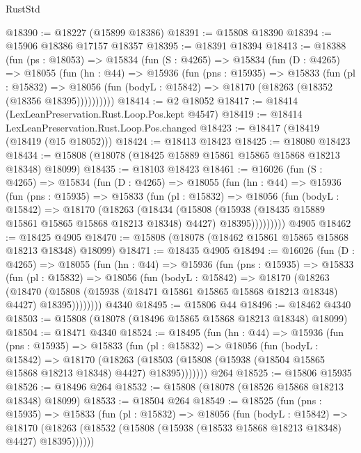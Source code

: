 \begin{lexlean}{RustStd}
\begin{coremodule}
@18390 := @18227 (@15899 @18386)
@18391 := @15808 @18390
@18394 := @15906 @18386 @17157 @18357
@18395 := @18391 @18394
@18413 := @18388
    (fun (ps : @18053) =>
    @15834
      (fun (S : @4265) =>
      @15834
        (fun (D : @4265) =>
        @18055
          (fun (hn : @44) =>
          @15936
            (fun (pns : @15935) =>
            @15833
              (fun (pl : @15832) =>
              @18056 (fun (bodyL : @15842) => @18170 (@18263 (@18352 (@18356 @18395))))))))))
@18414 := @2 @18052
@18417 := @18414 (LexLeanPreservation.Rust.Loop.Pos.kept @4547)
@18419 := @18414 LexLeanPreservation.Rust.Loop.Pos.changed
@18423 := @18417 (@18419 (@18419 (@15 @18052)))
@18424 := @18413 @18423
@18425 := @18080 @18423
@18434 := @15808 (@18078 (@18425 @15889 @15861 @15865 @15868 @18213 @18348) @18099)
@18435 := @18103 @18423
@18461 := @16026
    (fun (S : @4265) =>
    @15834
      (fun (D : @4265) =>
      @18055
        (fun (hn : @44) =>
        @15936
          (fun (pns : @15935) =>
          @15833
            (fun (pl : @15832) =>
            @18056
              (fun (bodyL : @15842) =>
              @18170
                (@18263
                  (@18434
                    (@15808
                      (@15938 (@18435 @15889 @15861 @15865 @15868 @18213 @18348) @4427)
                      @18395)))))))))
    @4905
@18462 := @18425 @4905
@18470 := @15808 (@18078 (@18462 @15861 @15865 @15868 @18213 @18348) @18099)
@18471 := @18435 @4905
@18494 := @16026
    (fun (D : @4265) =>
    @18055
      (fun (hn : @44) =>
      @15936
        (fun (pns : @15935) =>
        @15833
          (fun (pl : @15832) =>
          @18056
            (fun (bodyL : @15842) =>
            @18170
              (@18263
                (@18470
                  (@15808 (@15938 (@18471 @15861 @15865 @15868 @18213 @18348) @4427) @18395))))))))
    @4340
@18495 := @15806 @44
@18496 := @18462 @4340
@18503 := @15808 (@18078 (@18496 @15865 @15868 @18213 @18348) @18099)
@18504 := @18471 @4340
@18524 := @18495
    (fun (hn : @44) =>
    @15936
      (fun (pns : @15935) =>
      @15833
        (fun (pl : @15832) =>
        @18056
          (fun (bodyL : @15842) =>
          @18170
            (@18263
              (@18503 (@15808 (@15938 (@18504 @15865 @15868 @18213 @18348) @4427) @18395)))))))
    @264
@18525 := @15806 @15935
@18526 := @18496 @264
@18532 := @15808 (@18078 (@18526 @15868 @18213 @18348) @18099)
@18533 := @18504 @264
@18549 := @18525
    (fun (pns : @15935) =>
    @15833
      (fun (pl : @15832) =>
      @18056
        (fun (bodyL : @15842) =>
        @18170 (@18263 (@18532 (@15808 (@15938 (@18533 @15868 @18213 @18348) @4427) @18395))))))

\end{coremodule}
\end{lexlean}
